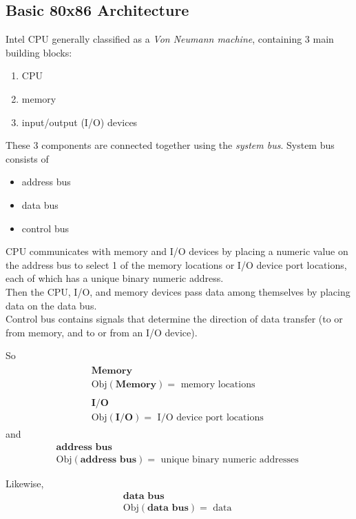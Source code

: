 \documentclass[10pt]{amsart}
\begin{document}
\begin{multicols*}{2}
\subsection{Basic 80x86 Architecture}  

Intel CPU generally classified as a \emph{Von Neumann machine}, containing 3 main building blocks:
\begin{enumerate}
	\item CPU
	\item memory
	\item input/output (I/O) devices
\end{enumerate}
These 3 components are connected together using the \emph{system bus}.  System bus consists of 
\begin{itemize}
	\item address bus
	\item data bus
	\item control bus
\end{itemize}

CPU communicates with memory and I/O devices by placing a numeric value on the address bus to select 1 of the memory locations or I/O device port locations, each of which has a unique binary numeric address.   \\
Then the CPU, I/O, and memory devices pass data among themselves by placing data on the data bus.   \\
Control bus contains signals that determine the direction of data transfer (to or from memory, and to or from an I/O device).  

So 
\[
\begin{gathered}
\begin{gathered}
\textbf{Memory} \\
\text{Obj}{(\textbf{Memory})} = \text{ memory locations } 
\end{gathered} \\ 
\begin{gathered}
\textbf{I/O} \\
\text{Obj}{(\textbf{I/O})} = \text{ I/O device port locations } 
\end{gathered}
\end{gathered}
\]
and 
\[
\begin{gathered}
\textbf{address bus} \\
\text{Obj}{(\textbf{address bus})} = \text{ unique binary numeric addresses } 
\end{gathered}
\]

Likewise, 
\[
\begin{gathered}
\textbf{data bus} \\
\text{Obj}{(\textbf{data bus})} = \text{ data } 
\end{gathered}
\]


\end{multicols*}
\end{document}
